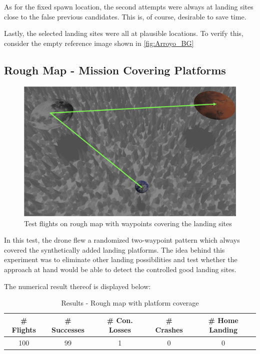     As for the fixed spawn location, the second attempts were always at landing sites close to the false previous candidates. This is, of course, desirable to save time.

    Lastly, the selected landing sites were all at plausible locations. To verify this, consider the empty reference image shown in \cref{fig:Arroyo_BG}

\subsection{Rough Map - Mission Covering Platforms}\label{subsec:rough_coverage}
        \begin{figure}[h]
            \centering
            \includegraphics[scale=0.24]{images/evaluation/rough_over_platforms.png}
            \caption{Test flights on rough map with waypoints covering the landing sites}
            \label{fig:rough_covered}
        \end{figure}

        In this test, the drone flew a randomized two-waypoint pattern which always covered the synthetically added landing platforms. The idea behind this experiment was to eliminate other landing possibilities and test whether the approach at hand would be able to detect the controlled good landing sites.

        The numerical result thereof is displayed below:

        \begin{table}[h]
            \begin{center}
             \caption{Results - Rough map with platform coverage}\vspace{1ex}
             \label{tab:result_rough_covered}
             \begin{tabular}{|c|c|c|c|c|}
             \hline
             \# Flights & \# Successes & \# Con. Losses & \# Crashes & \# Home Landing\\ \hline \hline
             100 & 99 & 1 & 0 & 0 \\
             \hline
             \end{tabular}
            \end{center}
        \end{table}

